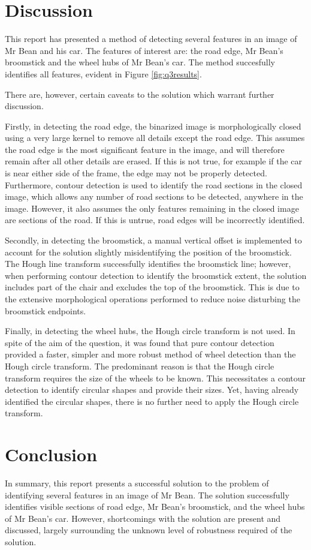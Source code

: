 \newpage
\section{Discussion}

This report has presented a method of detecting several features in an image of Mr Bean and his car. The features of interest are: the road edge, Mr Bean's broomstick and the wheel hubs of Mr Bean's car. The method succesfully identifies all features, evident in Figure \ref{fig:q3results}.

There are, however, certain caveats to the solution which warrant further discussion.

Firstly, in detecting the road edge, the binarized image is morphologically closed using a very large kernel to remove all details except the road edge. This assumes the road edge is the most significant feature in the image, and will therefore remain after all other details are erased. If this is not true, for example if the car is near either side of the frame, the edge may not be properly detected. Furthermore, contour detection is used to identify the road sections in the closed image, which allows any number of road sections to be detected, anywhere in the image. However, it also assumes the only features remaining in the closed image are sections of the road. If this is untrue, road edges will be incorrectly identified.

Secondly, in detecting the broomstick, a manual vertical offset is implemented to account for the solution slightly misidentifying the position of the broomstick. The Hough line transform successfully identifies the broomstick line; however, when performing contour detection to identify the broomstick extent, the solution includes part of the chair and excludes the top of the broomstick. This is due to the extensive morphological operations performed to reduce noise disturbing the broomstick endpoints.

Finally, in detecting the wheel hubs, the Hough circle transform is not used. In spite of the aim of the question, it was found that pure contour detection provided a faster, simpler and more robust method of wheel detection than the Hough circle transform. The predominant reason is that the Hough circle transform requires the size of the wheels to be known. This necessitates a contour detection to identify circular shapes and provide their sizes. Yet, having already identified the circular shapes, there is no further need to apply the Hough circle transform.

\section{Conclusion}

In summary, this report presents a successful solution to the problem of identifying several features in an image of Mr Bean. The solution successfully identifies visible sections of road edge, Mr Bean's broomstick, and the wheel hubs of Mr Bean's car. However, shortcomings with the solution are present and discussed, largely surrounding the unknown level of robustness required of the solution.
